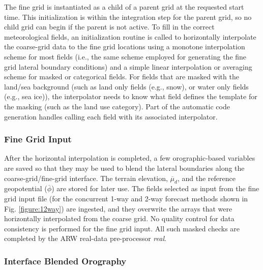 The fine grid is instantiated as a child 
of a parent grid at the requested start time.
This initialization is within the integration step for the parent 
grid, so no child grid can begin if the parent is not active.  
To fill in the correct meteorological 
fields, an initialization routine is called to horizontally interpolate
the coarse-grid data to the fine grid locations using a monotone
interpolation scheme \citep[described in][]{smolargrell92} for most fields 
(i.e., the same scheme employed for generating the fine grid lateral
boundary conditions)
and a simple linear interpolation or averaging scheme for masked or
categorical fields.
For fields that are masked with the land/sea background (such 
as land only fields (e.g., snow), or water only fields (e.g., sea ice)), the 
interpolator needs to know what field defines the template for the masking
(such as the land use category).  Part of the automatic code generation handles
calling each field with its associated interpolator.

\subsubsection{Fine Grid Input}

After the horizontal interpolation is completed, a few orographic-based variables 
are saved so that they may be used to blend the lateral boundaries
along the coarse-grid/fine-grid interface.  
The terrain elevation, 
$\overline {\mu}_d$,
and the reference geopotential ($\overline{\phi}$) are stored for later use.
The fields selected as input from the fine grid input file (for the
concurrent 1-way and 2-way forecast methods shown in Fig. \ref{figure:12way}) are ingested, and
they overwrite the arrays that were horizontally interpolated from the
coarse grid.  No quality control for data consistency is performed
for the fine grid input.  All such masked checks are
completed by the ARW real-data pre-processor {\it real}.

\subsubsection{Interface Blended Orography}

